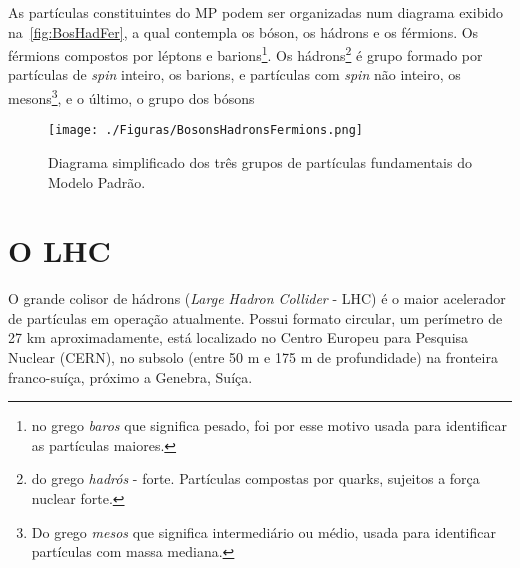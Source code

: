 
As partículas constituintes do MP podem ser organizadas num diagrama exibido na~\autoref{fig:BosHadFer}, a qual contempla os bóson, os hádrons e os férmions. Os férmions compostos por léptons e barions\footnote{no grego \textit{baros} que significa pesado, foi por esse motivo usada para identificar as partículas maiores.}. Os hádrons\footnote{do grego \textit{hadrós} - forte. Partículas compostas por quarks, sujeitos a força nuclear forte.} é grupo formado por partículas de \textit{spin} inteiro, os barions, e partículas com \textit{spin} não inteiro, os mesons\footnote{Do grego \textit{mesos} que significa intermediário ou médio, usada para identificar partículas com massa mediana.}, e o último, o grupo dos bósons

\begin{figure}[H]
	\begin{center}
		\caption{Diagrama simplificado dos três grupos de partículas fundamentais do Modelo Padrão.}
		\texttt{[image: ./Figuras/BosonsHadronsFermions.png]}
		\label{fig:BosHadFer}
	\end{center}
\end{figure}

\section{O LHC}

O grande colisor de hádrons (\textit{Large Hadron Collider} - LHC) \cite{cern2017} é o maior acelerador de partículas em operação atualmente. Possui formato circular, um perímetro de 27 km aproximadamente, está localizado no Centro Europeu para Pesquisa Nuclear (CERN), no subsolo (entre 50 m e 175 m de profundidade) na fronteira franco-suíça, próximo a Genebra, Suíça. 



